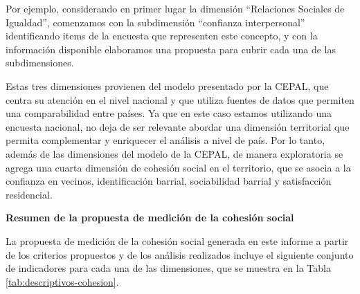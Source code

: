 \documentclass[
  12pt,
]{book}
\begin{document}
Por ejemplo, considerando en primer lugar la dimensión ``Relaciones Sociales de Igualdad'', comenzamos con la subdimensión ``confianza interpersonal'' identificando items de la encuesta que representen este concepto, y con la información disponible elaboramos una propuesta para cubrir cada una de las subdimensiones.

Estas tres dimensiones provienen del modelo presentado por la CEPAL, que centra su atención en el nivel nacional y que utiliza fuentes de datos que permiten una comparabilidad entre países. Ya que en este caso estamos utilizando una encuesta nacional, no deja de ser relevante abordar una dimensión territorial que permita complementar y enriquecer el análisis a nivel de país. Por lo tanto, además de las dimensiones del modelo de la CEPAL, de manera exploratoria se agrega una cuarta dimensión de cohesión social en el territorio, que se asocia a la confianza en vecinos, identificación barrial, sociabilidad barrial y satisfacción residencial.

\textbf{Resumen de la propuesta de medición de la cohesión social}

La propuesta de medición de la cohesión social generada en este informe a partir de los criterios propuestos y de los análisis realizados incluye el siguiente conjunto de indicadores para cada una de las dimensiones, que se muestra en la Tabla \ref{tab:descriptivos-cohesion}.
\end{document}
